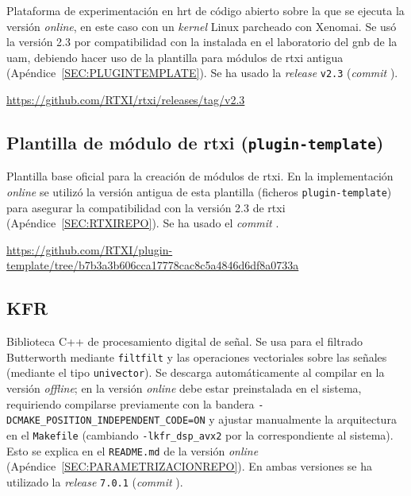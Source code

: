 Plataforma de experimentación en \ac{hrt} de código abierto sobre la que se ejecuta la versión \textit{online}, en este caso con un \textit{kernel} Linux parcheado con Xenomai. Se usó la versión 2.3 por compatibilidad con la instalada en el laboratorio del \ac{gnb} de la \ac{uam}, debiendo hacer uso de la plantilla para módulos de \ac{rtxi} antigua (Apéndice~\ref{SEC:PLUGINTEMPLATE}). Se ha usado la \textit{release} \texttt{v2.3} (\textit{commit} \texttt{}).

\url{https://github.com/RTXI/rtxi/releases/tag/v2.3}


\subsection{Plantilla de módulo de \acs{rtxi} (\texttt{plugin-template})\label{SEC:PLUGINTEMPLATE}}

Plantilla base oficial para la creación de módulos de \ac{rtxi}. En la implementación \textit{online} se utilizó la versión antigua de esta plantilla (ficheros \texttt{plugin-template}) para asegurar la compatibilidad con la versión 2.3 de \ac{rtxi} (Apéndice~\ref{SEC:RTXIREPO}). Se ha usado el \textit{commit} \texttt{}.

\url{https://github.com/RTXI/plugin-template/tree/b7b3a3b606cca17778cac8c5a4846d6df8a0733a}


\subsection{KFR\label{SUBSEC:KFRREPO}}

Biblioteca C++ de procesamiento digital de señal. Se usa para el filtrado Butterworth mediante \texttt{filtfilt} y las operaciones vectoriales sobre las señales (mediante el tipo \texttt{univector}). Se descarga automáticamente al compilar en la versión \textit{offline}; en la versión \textit{online} debe estar preinstalada en el sistema, requiriendo compilarse previamente con la bandera \texttt{-DCMAKE\_POSITION\_INDEPENDENT\_CODE=ON} y ajustar manualmente la arquitectura en el \texttt{Makefile} (cambiando \texttt{-lkfr\_dsp\_avx2} por la correspondiente al sistema). Esto se explica en el \texttt{README.md} de la versión \textit{online} (Apéndice~\ref{SEC:PARAMETRIZACIONREPO}). En ambas versiones se ha utilizado la \textit{release} \texttt{7.0.1} (\textit{commit} \texttt{}).

